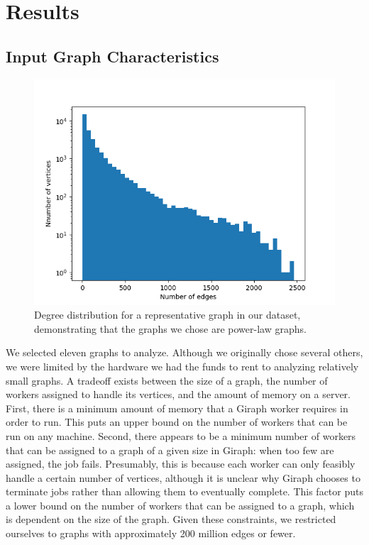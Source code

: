 \section{Results}
\label{sec:eval}

\subsection{Input Graph Characteristics}

\begin{figure}
	\centering
	\includegraphics[width=\columnwidth]{../good_plots/degree_distribution_10_mil.png}
	\caption{Degree distribution for a representative graph in our dataset, 
		demonstrating that the graphs we chose are power-law graphs.}
	\label{fig:degree_distribution}
\end{figure}

We selected eleven graphs to analyze. Although we originally chose several 
others, we were limited by the hardware we had the funds to rent to analyzing 
relatively small graphs. A tradeoff exists between the size of a graph, the 
number of workers assigned to handle its vertices, and the amount of memory on 
a server. First, there is a minimum amount of memory that a Giraph worker 
requires in 
order to run. This puts an upper bound on the number of workers that can be run 
on any machine. Second, there appears to be a minimum number of workers that 
can be assigned to a graph of a given size in Giraph: when too few are 
assigned, the job fails. Presumably, this is because each worker can only 
feasibly handle a certain number of vertices, although it is unclear why Giraph 
chooses to terminate jobs rather than allowing them to eventually complete. 
This factor puts a lower bound on the number of workers that can be assigned to 
a graph, which is dependent on the size of the graph. Given these constraints, 
we restricted ourselves to graphs with approximately 200 million edges or fewer.

